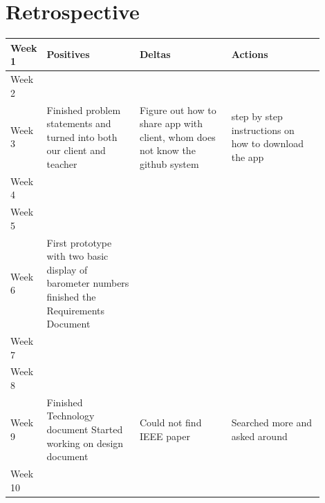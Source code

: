 \documentclass[onecolumn, draftclsnofoot,10pt, compsoc]{IEEEtran}
\begin{document}
\section{Retrospective}
\begin{center}
	\begin{tabular}{| l | p{0.3\linewidth} | p{0.3\linewidth} | p{0.3\linewidth} |}
		\hline
		Week 1 & Positives & Deltas & Actions \\ \hline
		Week 2 & & & \\ \hline				%
		Week 3 & Finished problem statements and turned into both our client and teacher
 & Figure out how to share app with client, whom does not know the github system
 & step by step instructions on how to download the app \\ \hline
		Week 4 & & & \\ \hline
		Week 5 & & & \\ \hline
		Week 6 &First prototype with two basic display of barometer numbers
  finished the Requirements Document & & \\ \hline
		Week 7 & & & \\ \hline
		Week 8 & & & \\ \hline
		Week 9 &Finished Technology document
Started working on design document
 & Could not find IEEE paper & Searched more and asked around\\ \hline
		Week 10 & & & \\ \hline			




	\end{tabular}
\end{center}
\end{document}
